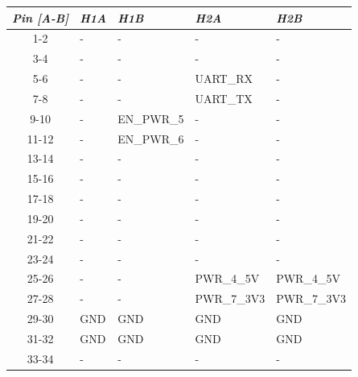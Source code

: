 \begin{table}[!h]
    \centering
    \begin{tabular}{cllll}
        \toprule[1.5pt]
        \textit{Pin [A-B]} & \textit{H1A}     & \textit{H1B}     & \textit{H2A}  & \textit{H2B}  \\
        \midrule
        1-2                & -                & -                & -             & -             \\
        3-4                & -                & -                & -             & -             \\
        5-6                & -                & -                & UART\_RX      & -             \\
        7-8                & -                & -                & UART\_TX      & -             \\
        9-10               & -                & EN\_PWR\_5       & -             & -             \\
        11-12              & -                & EN\_PWR\_6       & -             & -             \\
        13-14              & -                & -                & -             & -             \\
        15-16              & -                & -                & -             & -             \\
        17-18              & -                & -                & -             & -             \\
        19-20              & -                & -                & -             & -             \\
        21-22              & -                & -                & -             & -             \\
        23-24              & -                & -                & -             & -             \\
        25-26              & -                & -                & PWR\_4\_5V    & PWR\_4\_5V    \\
        27-28              & -                & -                & PWR\_7\_3V3   & PWR\_7\_3V3   \\
        29-30              & GND              & GND              & GND           & GND           \\
        31-32              & GND              & GND              & GND           & GND           \\
        33-34              & -                & -                & -             & -             \\

\end{tabular}
\end{table}
